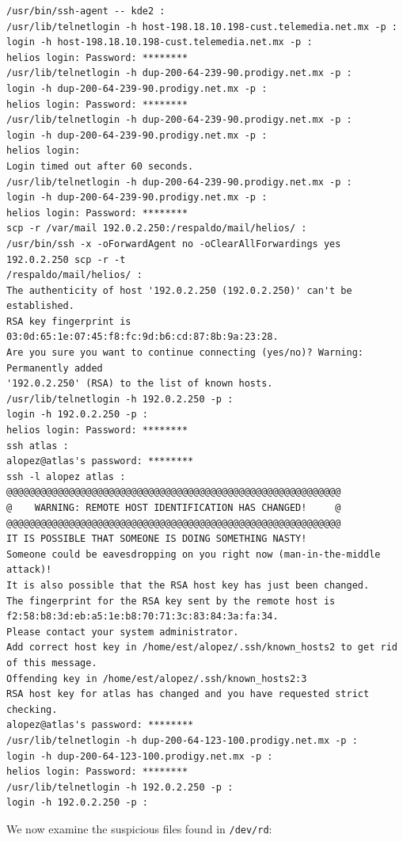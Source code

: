 \begin{lstlisting}[style=terminal]
/usr/bin/ssh-agent -- kde2 :
/usr/lib/telnetlogin -h host-198.18.10.198-cust.telemedia.net.mx -p :
login -h host-198.18.10.198-cust.telemedia.net.mx -p :
helios login: Password: ********
/usr/lib/telnetlogin -h dup-200-64-239-90.prodigy.net.mx -p :
login -h dup-200-64-239-90.prodigy.net.mx -p :
helios login: Password: ********
/usr/lib/telnetlogin -h dup-200-64-239-90.prodigy.net.mx -p :
login -h dup-200-64-239-90.prodigy.net.mx -p :
helios login: 
Login timed out after 60 seconds.
/usr/lib/telnetlogin -h dup-200-64-239-90.prodigy.net.mx -p :
login -h dup-200-64-239-90.prodigy.net.mx -p :
helios login: Password: ********
scp -r /var/mail 192.0.2.250:/respaldo/mail/helios/ :
/usr/bin/ssh -x -oForwardAgent no -oClearAllForwardings yes 192.0.2.250 scp -r -t 
/respaldo/mail/helios/ :
The authenticity of host '192.0.2.250 (192.0.2.250)' can't be established.
RSA key fingerprint is 03:0d:65:1e:07:45:f8:fc:9d:b6:cd:87:8b:9a:23:28.
Are you sure you want to continue connecting (yes/no)? Warning: Permanently added 
'192.0.2.250' (RSA) to the list of known hosts.
/usr/lib/telnetlogin -h 192.0.2.250 -p :
login -h 192.0.2.250 -p :
helios login: Password: ********
ssh atlas :
alopez@atlas's password: ********
ssh -l alopez atlas :
@@@@@@@@@@@@@@@@@@@@@@@@@@@@@@@@@@@@@@@@@@@@@@@@@@@@@@@@@@@
@    WARNING: REMOTE HOST IDENTIFICATION HAS CHANGED!     @
@@@@@@@@@@@@@@@@@@@@@@@@@@@@@@@@@@@@@@@@@@@@@@@@@@@@@@@@@@@
IT IS POSSIBLE THAT SOMEONE IS DOING SOMETHING NASTY!
Someone could be eavesdropping on you right now (man-in-the-middle attack)!
It is also possible that the RSA host key has just been changed.
The fingerprint for the RSA key sent by the remote host is
f2:58:b8:3d:eb:a5:1e:b8:70:71:3c:83:84:3a:fa:34.
Please contact your system administrator.
Add correct host key in /home/est/alopez/.ssh/known_hosts2 to get rid of this message.
Offending key in /home/est/alopez/.ssh/known_hosts2:3
RSA host key for atlas has changed and you have requested strict checking.
alopez@atlas's password: ********
/usr/lib/telnetlogin -h dup-200-64-123-100.prodigy.net.mx -p :
login -h dup-200-64-123-100.prodigy.net.mx -p :
helios login: Password: ********
/usr/lib/telnetlogin -h 192.0.2.250 -p :
login -h 192.0.2.250 -p :
\end{lstlisting}

\vspace{1em}

We now examine the suspicious files found in \texttt{/dev/rd}:

\vspace{1em}

